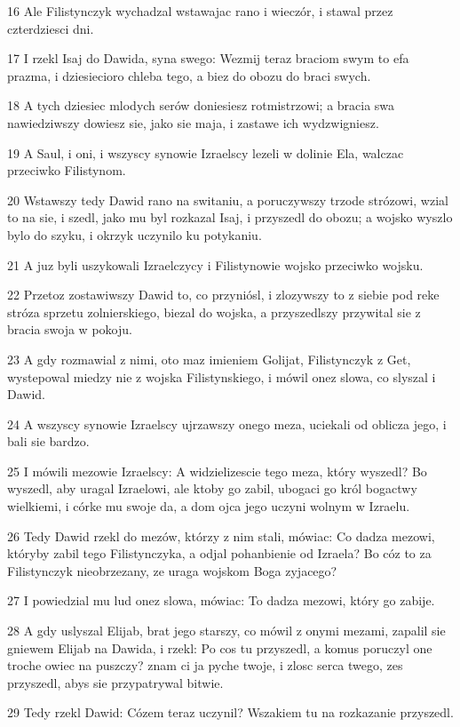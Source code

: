 \par 16 Ale Filistynczyk wychadzal wstawajac rano i wieczór, i stawal przez czterdziesci dni.
\par 17 I rzekl Isaj do Dawida, syna swego: Wezmij teraz braciom swym to efa prazma, i dziesiecioro chleba tego, a biez do obozu do braci swych.
\par 18 A tych dziesiec mlodych serów doniesiesz rotmistrzowi; a bracia swa nawiedziwszy dowiesz sie, jako sie maja, i zastawe ich wydzwigniesz.
\par 19 A Saul, i oni, i wszyscy synowie Izraelscy lezeli w dolinie Ela, walczac przeciwko Filistynom.
\par 20 Wstawszy tedy Dawid rano na switaniu, a poruczywszy trzode strózowi, wzial to na sie, i szedl, jako mu byl rozkazal Isaj, i przyszedl do obozu; a wojsko wyszlo bylo do szyku, i okrzyk uczynilo ku potykaniu.
\par 21 A juz byli uszykowali Izraelczycy i Filistynowie wojsko przeciwko wojsku.
\par 22 Przetoz zostawiwszy Dawid to, co przyniósl, i zlozywszy to z siebie pod reke stróza sprzetu zolnierskiego, biezal do wojska, a przyszedlszy przywital sie z bracia swoja w pokoju.
\par 23 A gdy rozmawial z nimi, oto maz imieniem Golijat, Filistynczyk z Get, wystepowal miedzy nie z wojska Filistynskiego, i mówil onez slowa, co slyszal i Dawid.
\par 24 A wszyscy synowie Izraelscy ujrzawszy onego meza, uciekali od oblicza jego, i bali sie bardzo.
\par 25 I mówili mezowie Izraelscy: A widzielizescie tego meza, który wyszedl? Bo wyszedl, aby uragal Izraelowi, ale ktoby go zabil, ubogaci go król bogactwy wielkiemi, i córke mu swoje da, a dom ojca jego uczyni wolnym w Izraelu.
\par 26 Tedy Dawid rzekl do mezów, którzy z nim stali, mówiac: Co dadza mezowi, któryby zabil tego Filistynczyka, a odjal pohanbienie od Izraela? Bo cóz to za Filistynczyk nieobrzezany, ze uraga wojskom Boga zyjacego?
\par 27 I powiedzial mu lud onez slowa, mówiac: To dadza mezowi, który go zabije.
\par 28 A gdy uslyszal Elijab, brat jego starszy, co mówil z onymi mezami, zapalil sie gniewem Elijab na Dawida, i rzekl: Po cos tu przyszedl, a komus poruczyl one troche owiec na puszczy? znam ci ja pyche twoje, i zlosc serca twego, zes przyszedl, abys sie przypatrywal bitwie.
\par 29 Tedy rzekl Dawid: Cózem teraz uczynil? Wszakiem tu na rozkazanie przyszedl.
